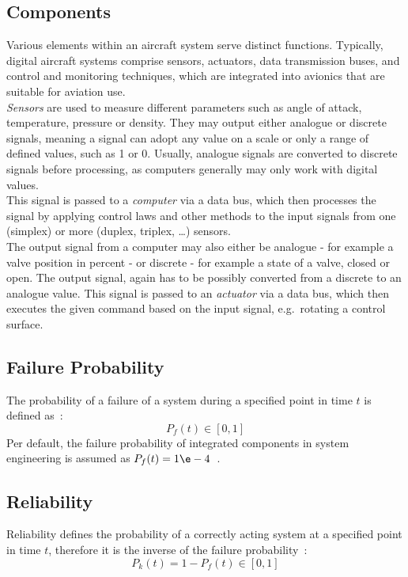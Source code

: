 \subsection{Components}\label{subsec:components}
Various elements within an aircraft system serve distinct functions.
Typically, digital aircraft systems comprise sensors, actuators, data transmission buses,
and control and monitoring techniques, which are integrated into avionics that are suitable for aviation use.
\\
\textit{Sensors} are used to measure different parameters such as angle of attack, temperature, pressure or density.
They may output either analogue or discrete signals, meaning a signal can adopt any value on a scale or only a range of defined values,
such as 1 or 0.
Usually, analogue signals are converted to discrete signals before processing, as computers generally may only work with digital
values.
\\
This signal is passed to a \textit{computer} via a data bus, which then processes the signal by applying control laws and other methods to the
input signals from one (simplex) or more (duplex, triplex, \ldots) sensors.
\\
The output signal from a computer may also either be analogue - for example a valve position in percent - or discrete - for
example a state of a valve, closed or open.
The output signal, again has to be possibly converted from a discrete to an analogue value.
This signal is passed to an \textit{actuator} via a data bus, which then executes the given command based on the input signal,
e.g.\ rotating a control surface.


\subsection{Failure Probability}\label{subsec:failure-probability}
The probability of a failure of a system during a specified point in time $t$ is defined as~\cite{lfs2}:
\begin{equation}
    \label{eq:failure-probability}
    P_f(t) \in [0,1]
\end{equation}
Per default, the failure probability of integrated components in system engineering is assumed as $P_f(t) = 1\e-4$~\cite{lfs2}.
\subsection{Reliability}\label{subsec:reliability}
Reliability defines the probability of a correctly acting system at a specified point in time $t$,
therefore it is the inverse of the failure probability~\cite{lfs2}:
\begin{equation}
    \label{eq:reliability}
    P_k(t) = 1 - P_f(t) \in [0,1]
\end{equation}
